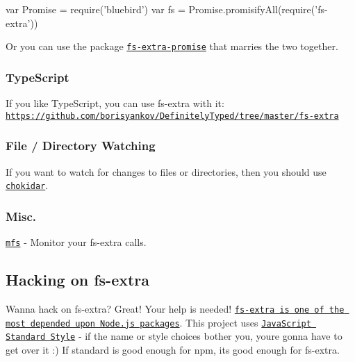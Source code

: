 \begin{DoxyCode}
var Promise = require('bluebird')
var fs = Promise.promisifyAll(require('fs-extra'))
\end{DoxyCode}


Or you can use the package \href{https://github.com/overlookmotel/fs-extra-promise}{\tt {\ttfamily fs-\/extra-\/promise}} that marries the two together.

\subsubsection*{Type\+Script}

If you like Type\+Script, you can use {\ttfamily fs-\/extra} with it\+: \href{https://github.com/borisyankov/DefinitelyTyped/tree/master/fs-extra}{\tt https\+://github.\+com/borisyankov/\+Definitely\+Typed/tree/master/fs-\/extra}

\subsubsection*{File / Directory Watching}

If you want to watch for changes to files or directories, then you should use \href{https://github.com/paulmillr/chokidar}{\tt chokidar}.

\subsubsection*{Misc.}


\begin{DoxyItemize}
\item \href{https://github.com/cadorn/mfs}{\tt mfs} -\/ Monitor your fs-\/extra calls.
\end{DoxyItemize}

\subsection*{Hacking on fs-\/extra }

Wanna hack on {\ttfamily fs-\/extra}? Great! Your help is needed! \href{http://nodei.co/npm/fs-extra.png?downloads=true&downloadRank=true&stars=true}{\tt fs-\/extra is one of the most depended upon Node.\+js packages}. This project uses \href{https://github.com/feross/standard}{\tt Java\+Script Standard Style} -\/ if the name or style choices bother you, you\textquotesingle{}re gonna have to get over it \+:) If {\ttfamily standard} is good enough for {\ttfamily npm}, it\textquotesingle{}s good enough for {\ttfamily fs-\/extra}.

